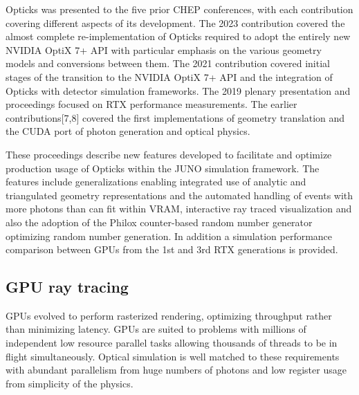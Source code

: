 \documentclass{webofc}
\newcommand{\comment}[1]{}
\begin{document}
Opticks was presented to the five prior CHEP conferences, with each contribution
covering different aspects of its development. The 2023 contribution\cite{chep2023} 
covered the almost complete re-implementation of Opticks required to adopt the entirely new NVIDIA OptiX 7+ API
with particular emphasis on the various geometry models and conversions between them.  
%
The 2021 contribution\cite{chep2021} covered initial stages of the transition to the NVIDIA OptiX 7+ API and 
the integration of Opticks with detector simulation frameworks. 
The 2019 plenary presentation and proceedings\cite{chep2019} focused on RTX\cite{rtx} performance measurements.
The earlier contributions[7,8] covered the first 
implementations of geometry translation and the CUDA port of photon generation and optical physics.

These proceedings describe new features developed to facilitate and optimize production usage of Opticks 
within the JUNO simulation framework. The features include generalizations enabling 
integrated use of analytic and triangulated geometry representations and the automated handling of 
events with more photons than can fit within VRAM, interactive ray traced visualization and also the adoption
of the Philox counter-based random number generator optimizing random number generation.
In addition a simulation performance comparison between GPUs from the 1st and 3rd RTX generations
is provided. 
%
%
\comment{
\subsection{Importance of optical photon simulation}%
%
%
Suppression of cosmic muon induced backgrounds with veto selections are crucial for neutrino
detectors such as JUNO\cite{juno}, necessitating production of large simulated samples of muon events. 
However, a muon of typical energy 200 GeV crossing the JUNO scintillator can yield tens of millions of 
optical photons, which are found with Geant4 simulations to consume more than 99\% of CPU time
and impose severe memory constraints.
%
As optical photons in neutrino detectors can be considered to be produced
only by scintillation and Cherenkov processes and yield only hits
on photomultiplier tubes, it is straightforward to combine an external optical photon simulation 
with a Geant4 simulation of all other particles.
}%
%
\subsection{GPU ray tracing}%
%
GPUs evolved to perform rasterized rendering, optimizing throughput\cite{throughput} rather than minimizing latency.
GPUs are suited to problems with millions of independent low resource parallel tasks allowing thousands of threads 
to be in flight simultaneously.
Optical simulation is well matched to these requirements with abundant parallelism 
from huge numbers of photons and low register usage from simplicity of the physics.
\end{document}
